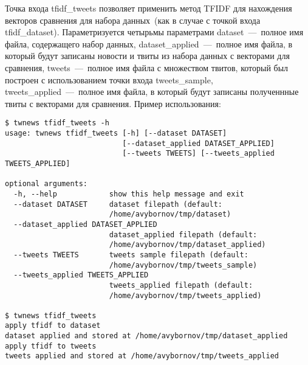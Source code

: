 
        Точка входа tfidf\_tweets позволяет применить метод TFIDF для нахождения векторов сравнения для набора данных~(как в случае с точкой входа tfidf\_dataset).
        Параметризуется четырьмы параметрами
        dataset~---~полное имя файла, содержащего набор данных,
        dataset_applied~---~полное имя файла, в который будут записаны новости и твиты из набора данных с векторами для сравнения,
        tweets~---~полное имя файла с множеством твитов, который был построен с использованием точки входа tweets\_sample,
        tweets_applied~---~полное имя файла, в который будут записаны полученнные твиты с векторами для сравнения.
        Пример использования:
        \begin{lstlisting}
$ twnews tfidf_tweets -h
usage: twnews tfidf_tweets [-h] [--dataset DATASET]
                           [--dataset_applied DATASET_APPLIED]
                           [--tweets TWEETS] [--tweets_applied TWEETS_APPLIED]

optional arguments:
  -h, --help            show this help message and exit
  --dataset DATASET     dataset filepath (default:
                        /home/avybornov/tmp/dataset)
  --dataset_applied DATASET_APPLIED
                        dataset_applied filepath (default:
                        /home/avybornov/tmp/dataset_applied)
  --tweets TWEETS       tweets sample filepath (default:
                        /home/avybornov/tmp/tweets_sample)
  --tweets_applied TWEETS_APPLIED
                        tweets_applied filepath (default:
                        /home/avybornov/tmp/tweets_applied)

$ twnews tfidf_tweets
apply tfidf to dataset
dataset applied and stored at /home/avybornov/tmp/dataset_applied
apply tfidf to tweets
tweets applied and stored at /home/avybornov/tmp/tweets_applied
        \end{lstlisting}



